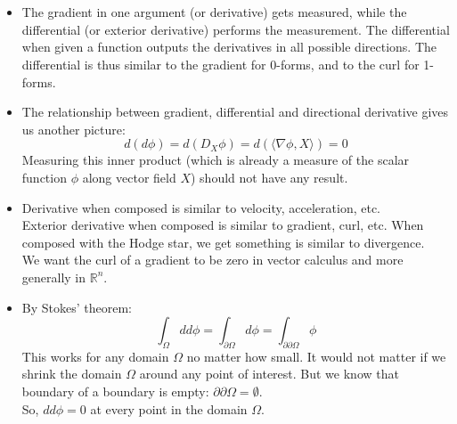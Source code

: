 \documentclass{article}
\begin{document}
\pagebreak
{}\\\\

\begin{itemize}

    \item
    The gradient in one argument (or derivative) gets measured, while the differential (or exterior derivative) performs the
    measurement. The differential when given a function outputs the derivatives in all possible directions.
    The differential is thus similar to the gradient for 0-forms, and to the curl for 1-forms.

    \item
    The relationship between gradient, differential and directional derivative gives us another picture:
    $$
        d(d\phi) = d(D_X\phi) = d(\langle \nabla\phi, X \rangle) = 0
    $$
    Measuring this inner product (which is already a measure of the scalar function $\phi$ along vector field $X$)
    should not have any result.

    \item
    Derivative when composed is similar to velocity, acceleration, etc.\\
    Exterior derivative when composed is similar to gradient, curl, etc.
    When composed with the Hodge star, we get something is similar to divergence.\\
    We want the curl of a gradient to be zero in vector calculus and more generally in $\mathbb{R}^n$.

    \item
    By Stokes' theorem:
    $$
        \int_\Omega dd\phi = \int_{\partial\Omega} d\phi = \int_{\partial\partial\Omega} \phi
    $$
    This works for any domain $\Omega$ no matter how small. It would not matter if we shrink the domain $\Omega$
    around any point of interest. But we know that boundary of a boundary is empty: $\partial\partial\Omega = \emptyset$.\\
    So, $dd\phi = 0$ at every point in the domain $\Omega$.

\end{itemize}


\vspace{1.8cm}
\\\\
\end{document}
